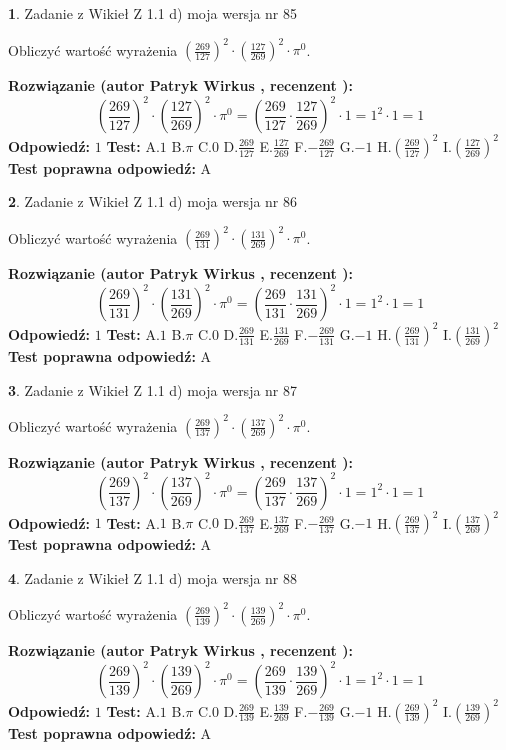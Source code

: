 \documentclass[12pt, a4paper]{article}
\theoremstyle{definition} %
\newtheorem{zad}{}
\newcommand{\zadStart}[1]{\begin{zad}#1\newline}
\newcommand{\zadStop}{\end{zad}}
\newcommand{\rozwStart}[2]{\noindent \textbf{Rozwiązanie (autor #1 , recenzent #2): }\newline}
\newcommand{\rozwStop}{\newline}
\newcommand{\odpStart}{\noindent \textbf{Odpowiedź:}\newline}
\newcommand{\odpStop}{\newline}
\newcommand{\testStart}{\noindent \textbf{Test:}\newline}
\newcommand{\testStop}{\newline}
\newcommand{\kluczStart}{\noindent \textbf{Test poprawna odpowiedź:}\newline}
\newcommand{\kluczStop}{\newline}
\begin{document}
\zadStart{Zadanie z Wikieł Z 1.1 d) moja wersja nr 85}

Obliczyć wartość wyrażenia $(\frac{269}{127})^{2} \cdot (\frac{127}{269})^{2} \cdot \pi^{0}$.
\zadStop
\rozwStart{Patryk Wirkus}{}
$$(\frac{269}{127})^{2} \cdot (\frac{127}{269})^{2} \cdot \pi^{0} = (\frac{269}{127} \cdot \frac{127}{269})^{2} \cdot 1 = 1^{2} \cdot 1 = 1$$
\rozwStop
\odpStart
$1$
\odpStop
\testStart
A.$1$ B.$\pi$ C.$0$ D.$\frac{269}{127}$ E.$\frac{127}{269}$
F.$-\frac{269}{127}$ G.$-1$
H.$(\frac{269}{127})^{2}$
I.$(\frac{127}{269})^{2}$
\testStop
\kluczStart
A
\kluczStop



\zadStart{Zadanie z Wikieł Z 1.1 d) moja wersja nr 86}

Obliczyć wartość wyrażenia $(\frac{269}{131})^{2} \cdot (\frac{131}{269})^{2} \cdot \pi^{0}$.
\zadStop
\rozwStart{Patryk Wirkus}{}
$$(\frac{269}{131})^{2} \cdot (\frac{131}{269})^{2} \cdot \pi^{0} = (\frac{269}{131} \cdot \frac{131}{269})^{2} \cdot 1 = 1^{2} \cdot 1 = 1$$
\rozwStop
\odpStart
$1$
\odpStop
\testStart
A.$1$ B.$\pi$ C.$0$ D.$\frac{269}{131}$ E.$\frac{131}{269}$
F.$-\frac{269}{131}$ G.$-1$
H.$(\frac{269}{131})^{2}$
I.$(\frac{131}{269})^{2}$
\testStop
\kluczStart
A
\kluczStop



\zadStart{Zadanie z Wikieł Z 1.1 d) moja wersja nr 87}

Obliczyć wartość wyrażenia $(\frac{269}{137})^{2} \cdot (\frac{137}{269})^{2} \cdot \pi^{0}$.
\zadStop
\rozwStart{Patryk Wirkus}{}
$$(\frac{269}{137})^{2} \cdot (\frac{137}{269})^{2} \cdot \pi^{0} = (\frac{269}{137} \cdot \frac{137}{269})^{2} \cdot 1 = 1^{2} \cdot 1 = 1$$
\rozwStop
\odpStart
$1$
\odpStop
\testStart
A.$1$ B.$\pi$ C.$0$ D.$\frac{269}{137}$ E.$\frac{137}{269}$
F.$-\frac{269}{137}$ G.$-1$
H.$(\frac{269}{137})^{2}$
I.$(\frac{137}{269})^{2}$
\testStop
\kluczStart
A
\kluczStop



\zadStart{Zadanie z Wikieł Z 1.1 d) moja wersja nr 88}

Obliczyć wartość wyrażenia $(\frac{269}{139})^{2} \cdot (\frac{139}{269})^{2} \cdot \pi^{0}$.
\zadStop
\rozwStart{Patryk Wirkus}{}
$$(\frac{269}{139})^{2} \cdot (\frac{139}{269})^{2} \cdot \pi^{0} = (\frac{269}{139} \cdot \frac{139}{269})^{2} \cdot 1 = 1^{2} \cdot 1 = 1$$
\rozwStop
\odpStart
$1$
\odpStop
\testStart
A.$1$ B.$\pi$ C.$0$ D.$\frac{269}{139}$ E.$\frac{139}{269}$
F.$-\frac{269}{139}$ G.$-1$
H.$(\frac{269}{139})^{2}$
I.$(\frac{139}{269})^{2}$
\testStop
\kluczStart
A
\kluczStop
\end{document}
